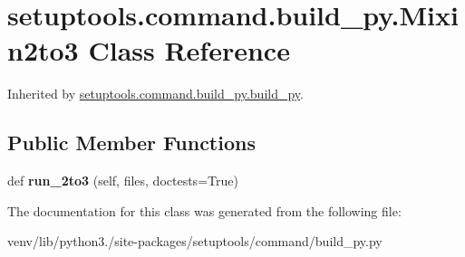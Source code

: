 \hypertarget{classsetuptools_1_1command_1_1build__py_1_1_mixin2to3}{}\section{setuptools.\+command.\+build\+\_\+py.\+Mixin2to3 Class Reference}
\label{classsetuptools_1_1command_1_1build__py_1_1_mixin2to3}


Inherited by \hyperlink{classsetuptools_1_1command_1_1build__py_1_1build__py}{setuptools.\+command.\+build\+\_\+py.\+build\+\_\+py}.

\subsection*{Public Member Functions}
\begin{DoxyCompactItemize}
\item 
\mbox{\label{classsetuptools_1_1command_1_1build__py_1_1_mixin2to3_a65bba09b327f28d7a1dbfbc15bff3017}} 
def {\bfseries run\+\_\+2to3} (self, files, doctests=True)
\end{DoxyCompactItemize}


The documentation for this class was generated from the following file\+:\begin{DoxyCompactItemize}
\item 
venv/lib/python3./site-\/packages/setuptools/command/build\+\_\+py.\+py\end{DoxyCompactItemize}
